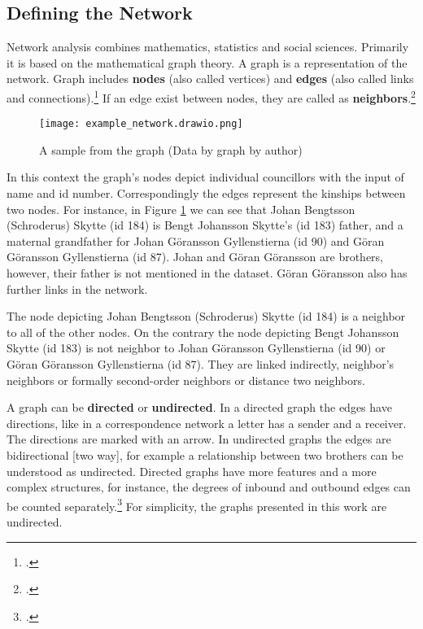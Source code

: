 \subsection{Defining the Network}
\label{network}
Network analysis combines mathematics, statistics and social sciences. Primarily it is based on the mathematical graph theory. A graph is a representation of the network. Graph includes \textbf{nodes} (also called vertices) and \textbf{edges} (also called links and connections).\footcites[p. 247, 248-249.]{huhtamakiEtAl}[pp. vi-vii]{RajPM2018a} If an edge exist between nodes, they are called as \textbf{neighbors}.\footcite[p. vii]{RajPM2018a}

\begin{figure}
	\texttt{[image: example\_network.drawio.png]}
	\centering
	\caption[A sample from the graph]{A sample from the graph (Data by \cite{councillorsDS} graph by author)} 
	\centering
	\label{samplegraph}
\end{figure}
In this context the graph's nodes depict individual councillors with the input of name and id number. Correspondingly the edges represent the kinships between two nodes. For instance, in Figure \ref{samplegraph} we can see that Johan Bengtsson (Schroderus) Skytte (id 184) is Bengt Johansson Skytte's (id 183) father, and a maternal grandfather for Johan Göransson Gyllenstierna (id 90) and Göran Göransson Gyllenstierna (id 87). Johan and Göran Göransson are brothers, however, their father is not mentioned in the dataset. Göran Göransson also has further links in the network.

The node depicting Johan Bengtsson (Schroderus) Skytte (id 184) is a neighbor to all of the other nodes. On the contrary the node depicting Bengt Johansson Skytte (id 183) is not neighbor to Johan Göransson Gyllenstierna (id 90) or Göran Göransson Gyllenstierna (id 87). They are linked indirectly, neighbor's neighbors or formally second-order neighbors or distance two neighbors. 

A graph can be \textbf{directed} or \textbf{undirected}. In a directed graph the edges have directions, like in a correspondence network a letter has a sender and a receiver. The directions are marked with an arrow. In undirected graphs the edges are bidirectional [two way], for example a relationship between two brothers can be understood as undirected. Directed graphs have more features and a more complex structures, for instance, the degrees of inbound and outbound edges can be counted separately.\footcite[pp. 1-2.]{RajPM2018} For simplicity, the graphs presented in this work are undirected.

